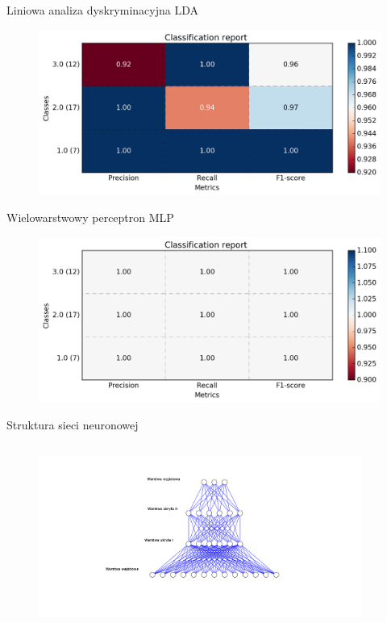 \documentclass[xcolor=x11names,compress]{beamer}
\renewcommand{\(}{\begin{columns}}
\renewcommand{\)}{\end{columns}}
\newcommand{\<}[1]{\begin{column}{#1}}
\renewcommand{\>}{\end{column}}
\begin{document}
\begin{frame}{Liniowa analiza dyskryminacyjna LDA}
        \begin{figure}\includegraphics[width=1\textwidth]{lda.png} \end{figure}

\end{frame}

\begin{frame}{Wielowarstwowy perceptron MLP}
        \begin{figure}\includegraphics[width=1\textwidth]{mlp.png} \end{figure}

\end{frame}
\begin{frame}{Struktura sieci neuronowej}
	\begin{columns}
	\column{\dimexpr\paperwidth-20pt}

        \begin{figure}\includegraphics[width=400]{nn.png} \end{figure}
        \end{columns}
\end{frame}
\end{document}
